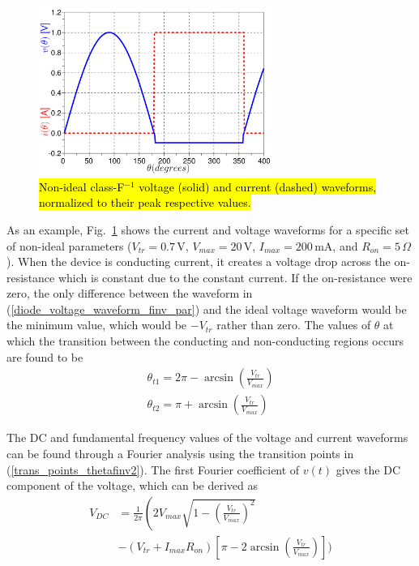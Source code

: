 \begin{figure}[!b]
  \begin{center}
  \includegraphics[width=3.0in]{pdf/05.pdf}
  \caption{\hl{Non-ideal class-F$^{-1}$ voltage (solid) and current (dashed) waveforms, normalized to their peak respective values.}}\label{finv_waveform_nonideal}
  \end{center}
\end{figure}

As an example, Fig.~\ref{finv_waveform_nonideal} shows the current and voltage waveforms for a specific set of non-ideal parameters ($V_{tr} = 0.7\,\textrm{V}$, $V_{max} = 20\,\textrm{V}$, $I_{max} = 200\,\textrm{mA}$, and $R_{on} = 5\,\Omega$). When the device is conducting current, it creates a voltage drop across the on-resistance which is constant due to the constant current. If the on-resistance were zero, the only difference between the waveform in (\ref{diode_voltage_waveform_finv_par}) and the ideal voltage waveform would be the minimum value, which would be $-V_{tr}$ rather than zero. The values of $\theta$ at which the transition between the conducting and non-conducting regions occurs are found to be
\begin{equation}\label{trans_points_thetafinv2}
\begin{array}{l}
    \theta_{t1} = 2\pi - \arcsin\left(\frac{V_{tr}}{V_{max}}\right) \\
    \theta_{t2} = \pi + \arcsin\left(\frac{V_{tr}}{V_{max}}\right)
\end{array}
\end{equation}

The DC and fundamental frequency values of the voltage and current waveforms can be found through a Fourier analysis using the transition points in (\ref{trans_points_thetafinv2}). The first Fourier coefficient of $v(t)$ gives the DC component of the voltage, which can be derived as
\begin{equation}\label{finv_dc_comp_5}\begin{split}
    V_{DC} &= \frac{1}{2\pi}\left(2V_{max}\sqrt{1 - \left(\frac{V_{tr}}{V_{max}}\right)^2} \right. \\
    &-(V_{tr} + I_{max}R_{on})\left[\pi - 2\arcsin\left(\frac{V_{tr}}{V_{max}}\right)\right]\Bigg)
\end{split}\end{equation}

